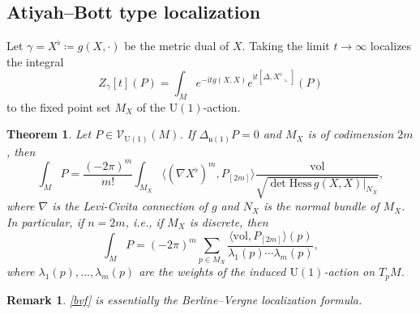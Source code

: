 \documentclass[12pt]{amsart}
\numberwithin{table}{section}
\numberwithin{equation}{section}
\newtheorem{rmk}{Remark}[section]
\newtheorem{thm}{Theorem}[section]
\theoremstyle{plain}
\newcommand{\U}{\mathrm{U}}
\newcommand{\ut}{\mathfrak{u}}
\newcommand{\Hess}{\mathrm{Hess}\,}
\newcommand{\vol}{\mathrm{vol}}
\newcommand{\MV}{\mathcal{V}}
\begin{document}
\subsection{Atiyah--Bott type localization}

Let $\gamma=X^{\flat}\coloneqq g(X, \cdot)$ be the metric dual of $X$. Taking the limit $t \to \infty$ localizes the integral 
\[
Z_{\gamma}[t](P) = \int_M e^{-\mathrm{i}tg(X,X)} e^{\mathrm{i}t[\Delta ,X^{\flat} \llcorner]}(P)
\]
to the fixed point set $M_{X}$ of the $\U(1)$-action.  %

\begin{thm}\label{pvloc}
	Let $P \in \MV_{\U(1)}(M)$. If $\Delta_{\ut(1)} P = 0$ and $M_X$ is of codimension $2m$, then
	\begin{equation}\label{pvab}
		\int_M P = \frac{(-2\pi)^{m}}{m!} \int_{M_X} \langle (\nabla X^{\flat})^m, P_{[2m]} \rangle \frac{\vol}{\sqrt{\det \Hess g(X,X)|_{N_X}}},
	\end{equation}
	where $\nabla$ is the Levi-Civita connection of $g$ and $N_X$ is the normal bundle of  $M_X$. In particular, if $n=2m$, i.e., if $M_X$ is discrete, then
	\begin{equation}\label{bvf}
		\int_M P = (-2\pi)^m \sum_{p \in M_{X}}\frac{\langle \vol, P_{[2m]}\rangle (p)}{\lambda_1(p)\cdots\lambda_m(p)},
	\end{equation}
	where $\lambda_1(p), \dots, \lambda_m(p)$ are the weights of the induced $\U(1)$-action on $T_pM$.
\end{thm}
\begin{rmk}
	\eqref{bvf} is essentially the Berline--Vergne localization formula.%
\end{rmk}
\end{document}
